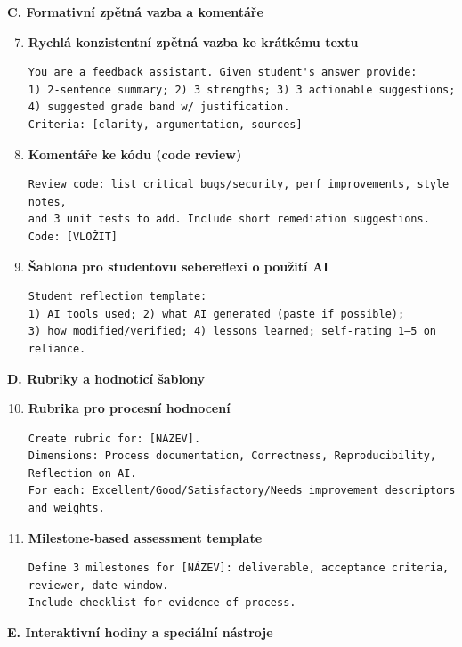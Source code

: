 \documentclass{report}%
\begin{document}
\medskip

\textbf{C. Formativní zpětná vazba a komentáře}

\begin{enumerate}
  \setcounter{enumi}{6}
  \item \textbf{Rychlá konzistentní zpětná vazba ke krátkému textu}
  \begin{verbatim}
You are a feedback assistant. Given student's answer provide:
1) 2-sentence summary; 2) 3 strengths; 3) 3 actionable suggestions;
4) suggested grade band w/ justification.
Criteria: [clarity, argumentation, sources]
  \end{verbatim}
  \item \textbf{Komentáře ke kódu (code review)}
  \begin{verbatim}
Review code: list critical bugs/security, perf improvements, style notes,
and 3 unit tests to add. Include short remediation suggestions.
Code: [VLOŽIT]
  \end{verbatim}
  \item \textbf{Šablona pro studentovu sebereflexi o použití AI}
  \begin{verbatim}
Student reflection template:
1) AI tools used; 2) what AI generated (paste if possible);
3) how modified/verified; 4) lessons learned; self-rating 1–5 on reliance.
  \end{verbatim}
\end{enumerate}

\medskip

\textbf{D. Rubriky a hodnoticí šablony}

\begin{enumerate}
  \setcounter{enumi}{9}
  \item \textbf{Rubrika pro procesní hodnocení}
  \begin{verbatim}
Create rubric for: [NÁZEV].
Dimensions: Process documentation, Correctness, Reproducibility, Reflection on AI.
For each: Excellent/Good/Satisfactory/Needs improvement descriptors and weights.
  \end{verbatim}
  \item \textbf{Milestone‑based assessment template}
  \begin{verbatim}
Define 3 milestones for [NÁZEV]: deliverable, acceptance criteria, reviewer, date window.
Include checklist for evidence of process.
  \end{verbatim}
\end{enumerate}

\medskip

\textbf{E. Interaktivní hodiny a speciální nástroje}
\end{document}
